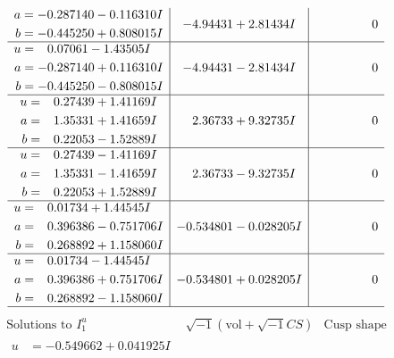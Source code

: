 \documentclass[1p]{elsarticle_modified}
\theoremstyle{definition}
\newcommand{\I}{\sqrt{-1}}
\begin{document}
$$\begin{array}{c|c|c}
\begin{aligned}
a &= -0.287140 - 0.116310 I \\
b &= -0.445250 + 0.808015 I\end{aligned}
 & -4.94431 + 2.81434 I & \phantom{-0.000000 } 0 \\ \hline\begin{aligned}
u &= \phantom{-}0.07061 - 1.43505 I \\
a &= -0.287140 + 0.116310 I \\
b &= -0.445250 - 0.808015 I\end{aligned}
 & -4.94431 - 2.81434 I & \phantom{-0.000000 } 0 \\ \hline\begin{aligned}
u &= \phantom{-}0.27439 + 1.41169 I \\
a &= \phantom{-}1.35331 + 1.41659 I \\
b &= \phantom{-}0.22053 - 1.52889 I\end{aligned}
 & \phantom{-}2.36733 + 9.32735 I & \phantom{-0.000000 } 0 \\ \hline\begin{aligned}
u &= \phantom{-}0.27439 - 1.41169 I \\
a &= \phantom{-}1.35331 - 1.41659 I \\
b &= \phantom{-}0.22053 + 1.52889 I\end{aligned}
 & \phantom{-}2.36733 - 9.32735 I & \phantom{-0.000000 } 0 \\ \hline\begin{aligned}
u &= \phantom{-}0.01734 + 1.44545 I \\
a &= \phantom{-}0.396386 - 0.751706 I \\
b &= \phantom{-}0.268892 + 1.158060 I\end{aligned}
 & -0.534801 - 0.028205 I & \phantom{-0.000000 } 0 \\ \hline\begin{aligned}
u &= \phantom{-}0.01734 - 1.44545 I \\
a &= \phantom{-}0.396386 + 0.751706 I \\
b &= \phantom{-}0.268892 - 1.158060 I\end{aligned}
 & -0.534801 + 0.028205 I & \phantom{-0.000000 } 0\\
 \hline 
 \end{array}$$\newpage$$\begin{array}{c|c|c}  
\text{Solutions to }I^u_{1}& \I (\text{vol} + \sqrt{-1}CS) & \text{Cusp shape}\\
 \hline 
\begin{aligned}
u &= -0.549662 + 0.041925 I \\

\end{aligned}
\end{array}$$
\end{document}
